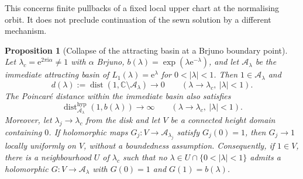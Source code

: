 \documentclass[11pt]{amsart}
\newtheorem{proposition}[theorem]{Proposition}
\theoremstyle{definition}
\newcommand{\eee}{\mathrm{e}}
\newcommand{\ii}{\mathrm{i}}
\begin{document}
This concerns finite pullbacks of a fixed local upper chart at the
normalising orbit.  It does not preclude continuation of the sewn
solution by a different mechanism.

\begin{proposition}[Collapse of the attracting basin at a Brjuno boundary point]
\label{prop:basin-inradius}
Let $\lambda_c=\eee^{2\pi\ii\alpha}\ne1$ with $\alpha$ Brjuno,
$b(\lambda)=\exp(\lambda\eee^{-\lambda})$, and let
$\mathcal A_\lambda$ be the immediate attracting basin of
$L_1(\lambda)=\eee^\lambda$ for $0<|\lambda|<1$.  Then
$1\in\mathcal A_\lambda$ and
\[
 d(\lambda):=\operatorname{dist}
       (1,\mathbb C\setminus\mathcal A_\lambda)
 \longrightarrow0
 \qquad(\lambda\to\lambda_c,\ |\lambda|<1).
\]
The Poincar\'e distance within the immediate basin also satisfies
\[
 \operatorname{dist}^{\mathrm{hyp}}_{\mathcal A_\lambda}
       (1,b(\lambda))\longrightarrow\infty
 \qquad(\lambda\to\lambda_c,\ |\lambda|<1).
\]
Moreover, let $\lambda_j\to\lambda_c$ from the disk and let $V$ be a
connected height domain containing $0$.  If holomorphic maps
$G_j:V\to\mathcal A_{\lambda_j}$ satisfy $G_j(0)=1$, then
$G_j\to1$ locally uniformly on $V$, without a boundedness assumption.
Consequently, if $1\in V$, there is a neighbourhood $U$ of $\lambda_c$
such that no $\lambda\in U\cap\{0<|\lambda|<1\}$ admits a holomorphic
$G:V\to\mathcal A_\lambda$ with $G(0)=1$ and $G(1)=b(\lambda)$.
\end{proposition}
\end{document}
